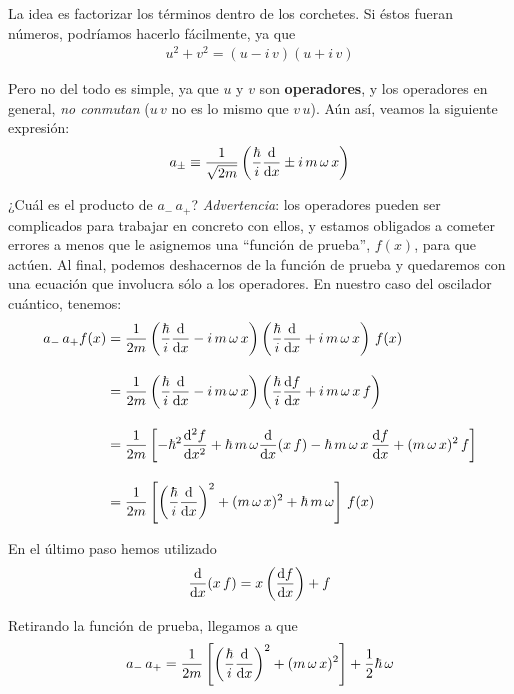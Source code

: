 La idea es factorizar los términos dentro de los corchetes. Si éstos fueran números, podríamos hacerlo fácilmente, ya que
\begin{align*}
u^{2} + v^{2} = (u - i \, v)(u + i \, v)
\end{align*}

Pero no del todo es simple, ya que $u$ y $v$ son \textbf{operadores}, y los operadores en general, \textit{no conmutan} ($u \, v$ no es lo mismo que $v \, u$). Aún así, veamos la siguiente expresión:
\begin{equation}
a_{\pm} \equiv \dfrac{1}{\sqrt{2 m }} \left( \dfrac{\hbar}{i} \dv{x} \pm i \, m \, \omega \, x \right)
\label{eq:ecuacion_02_041}
\end{equation}

¿Cuál es el producto de $a_{-} \, a_{+}$? \emph{Advertencia}: los operadores pueden ser complicados para trabajar en concreto con ellos, y estamos obligados a cometer errores a menos que le asignemos una \enquote{función de prueba}, $f (x)$, para que actúen. Al final, podemos deshacernos de la función de prueba y quedaremos con una ecuación que involucra sólo a los operadores. En nuestro caso del oscilador cuántico, tenemos:
\begin{align*}
a_{-} \, a_{+} f(x) &= \dfrac{1}{2 m} \left( \dfrac{\hbar}{i} \dv{x} - i \, m \, \omega \, x \right) \left( \dfrac{\hbar}{i} \dv{x} + i \, m \, \omega \, x \right) \, f(x) \\[1em]
&= \dfrac{1}{2 m} \left( \dfrac{\hbar}{i} \dv{x} - i \, m \, \omega \, x \right) \left( \dfrac{\hbar}{i} \dv{f}{x} + i \, m \, \omega \, x \, f \right) \\[1em]
&= \dfrac{1}{2 m}  \left[ - \hbar^{2} \dv[2]{f}{x} + \hbar \, m \, \omega \dv{x} (x \, f) - \hbar \, m \, \omega \, x \, \dv{f}{x} + (m \, \omega \, x)^{2} \, f \right] \\[1em]
&= \dfrac{1}{2 m} \left[ \left( \dfrac{\hbar}{i} \dv{x} \right)^{2} + (m \, \omega \, x)^{2} + \hbar \, m\, \omega \right] \, f(x)
\end{align*}

En el último paso hemos utilizado
\begin{align*}
\dv{x} (x \, f) = x \left( \dv{f}{x} \right) + f
\end{align*}

Retirando la función de prueba, llegamos a que
\begin{align}
a_{-} \, a_{+} = \dfrac{1}{2 m} \left[ \left( \dfrac{\hbar}{i} \dv{x} \right)^{2} + (m \, \omega \, x)^{2} \right] + \dfrac{1}{2} \hbar \, \omega
\label{eq:ecuacion_02_042}
\end{align}

